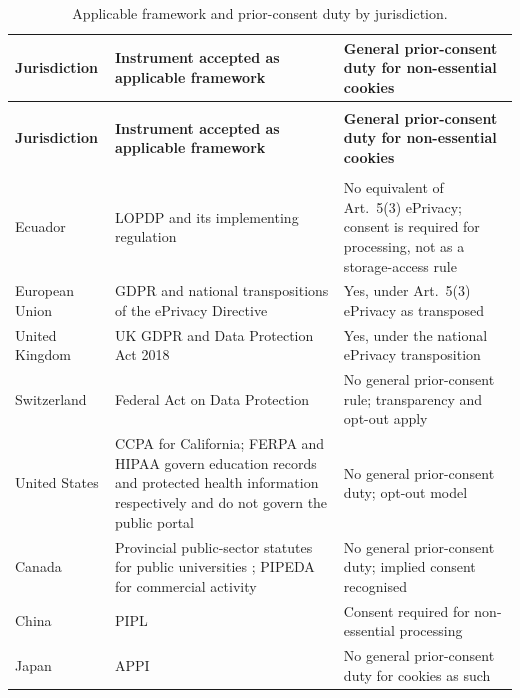 \documentclass[pdflatex,sn-basic,Numbered]{sn-jnl}
\theoremstyle{thmstyleone}
\theoremstyle{thmstyletwo}
\theoremstyle{thmstylethree}
\begin{document}
\begin{appendices}
\footnotesize
\begin{longtable}{@{}>{\RaggedRight}p{2.4cm}>{\RaggedRight}p{5.5cm}>{\RaggedRight\arraybackslash}p{4.1cm}@{}}
	\caption{Applicable framework and prior-consent duty by jurisdiction.}\label{tab:mapeo}\\
	\toprule
	\textbf{Jurisdiction} & \textbf{Instrument accepted as applicable framework} & \textbf{General prior-consent duty for non-essential cookies} \\
	\midrule
	\endfirsthead
	\multicolumn{3}{c}{\textit{(Table~\ref{tab:mapeo}, continued)}}\\
	\toprule
	\textbf{Jurisdiction} & \textbf{Instrument accepted as applicable framework} & \textbf{General prior-consent duty for non-essential cookies} \\
	\midrule
	\endhead
	\midrule
	\multicolumn{3}{r}{\textit{Continued on next page}}\\
	\endfoot
	\bottomrule
	\endlastfoot
	Ecuador & LOPDP and its implementing regulation \citep{lopdp2021,reglamentolopdp2023} & No equivalent of Art.\ 5(3) ePrivacy; consent is required for processing, not as a storage-access rule \\
	\addlinespace
	European Union & GDPR \citep{gdpr2016} and national transpositions of the ePrivacy Directive \citep{eprivacy2002} & Yes, under Art.\ 5(3) ePrivacy as transposed \citep{edpb2024eprivacy} \\
	\addlinespace
	United Kingdom & UK GDPR and Data Protection Act 2018 \citep{ukdpa2018} & Yes, under the national ePrivacy transposition \\
	\addlinespace
	Switzerland & Federal Act on Data Protection \citep{fadp_ch} & No general prior-consent rule; transparency and opt-out apply \\
	\addlinespace
	United States & CCPA \citep{ccpa2018} for California; FERPA \citep{ferpa1974} and HIPAA \citep{hipaa1996} govern education records and protected health information respectively and do not govern the public portal & No general prior-consent duty; opt-out model \\
	\addlinespace
	Canada & Provincial public-sector statutes for public universities \citep{fippa_on,fippa_bc,quebec_privacy}; PIPEDA \citep{pipeda2000} for commercial activity & No general prior-consent duty; implied consent recognised \\
	\addlinespace
	China & PIPL \citep{pipl2021} & Consent required for non-essential processing \\
	\addlinespace
	Japan & APPI \citep{appi2003} & No general prior-consent duty for cookies as such \\

\end{longtable}
\end{appendices}
\end{document}
